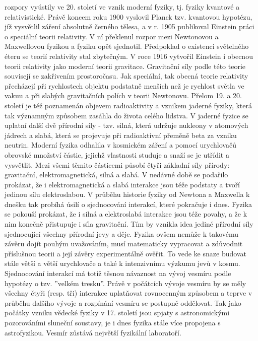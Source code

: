     rozpory vyústily ve 20. století ve vznik moderní fyziky, tj. fyziky kvantové a relativistické. Právě 
    koncem roku 1900 vyslovil Planck tzv. kvantovou hypotézu, jíž vysvětlil záření absolutně černého 
    tělesa, a v r. 1905 publikoval Einstein práci o speciální teorii relativity. V ní překlenul rozpor 
    mezi Newtonovou a Maxwellovou fyzikou a fyziku opět sjednotil. Předpoklad o existenci světelného 
    éteru se teorií relativity stal zbytečným. V roce 1916 vytvořil Einstein i obecnou teorii
    relativity jako moderní teorii gravitace. Gravitační síly podle této teorie souvisejí se zakřivením 
    prostoročasu. Jak speciální, tak obecná teorie relativity přecházejí při rychlostech objektu 
    podstatně menších než je rychlost světla ve vakuu a při slabých gravitačních polích v teorii 
    Newtonovu. Přelom 19. a 20. století je též poznamenán objevem radioaktivity a vznikem jaderné fyziky, 
    která tak významným způsobem zasáhla do života celého lidstva. V jaderné fyzice se uplatní další dvě 
    přírodní síly - tzv. silná, která udržuje nukleony v atomových jádrech a slabá, která se projevuje 
    při radioaktivní přeměně beta za vzniku neutrin. Moderní fyzika odhalila v kosmickém záření a pomocí 
    urychlovačů obrovské množství částic, jejichž vlastnosti studuje a snaží se je utřídit a vysvětlit. 
    Mezi všemi těmito částicemi působí čtyři základní síly přírody: gravitační, elektromagnetická, silná 
    a slabá. V nedávné době se podařilo prokázat, že i elektromagnetická a slabá interakce jsou téže 
    podstaty a tvoří jedinou sílu elektroslabou. V průběhu historie fyziky od Newtona a Maxwella k dnešku 
    tak probíhá úsilí o sjednocování interakcí, které pokračuje i dnes. Fyzika se pokouší prokázat, že i 
    silná a elektroslabá interakce jsou téže povahy, a že k nim konečně přistupuje i síla gravitační. Tím 
    by vznikla idea jediné přírodní síly sjednocující všechny přírodní jevy a děje. Fyzika ovšem nemůže k 
    takovému závěru dojít pouhým uvažováním, musí matematicky vypracovat a zdůvodnit příslušnou teorii a 
    její závěry experimentálně ověřit. To vede ke snaze budovat stále větší a větší urychlovače a také k 
    intenzivnímu výzkumu jevů v kosmu. Sjednocování interakcí má totiž těsnou návaznost na vývoj vesmíru 
    podle hypotézy o tzv. ”velkém tresku”. Právě v počátcích vývoje vesmíru by se měly všechny čtyři 
    (resp. tři) interakce uplatňovat rovnocenným způsobem a teprve v průběhu dalšího vývoje a rozpínání 
    vesmíru se postupně oddělovat. Tak jako počátky vzniku vědecké fyziky v 17. století jsou spjaty s 
    astronomickými pozorováními sluneční soustavy, je i dnes fyzika stále více propojena s astrofyzikou. 
    Vesmír zůstává největší fyzikální laboratoří.
\printbibliography[heading=subbibliography]

